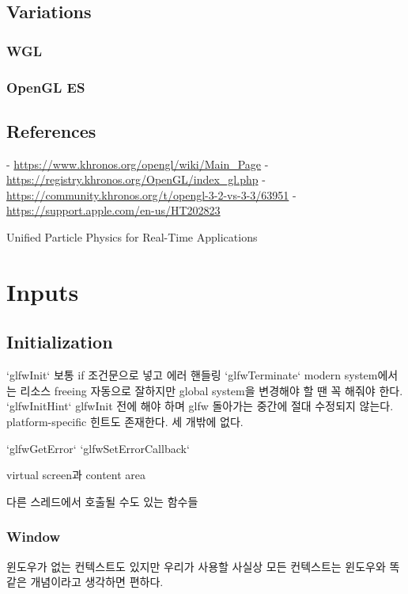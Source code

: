 \documentclass[a4paper]{report}
\begin{document}
\section{Variations}

\subsection{WGL}
\subsection{OpenGL ES}










\section{References}

- \url{https://www.khronos.org/opengl/wiki/Main_Page}
- \url{https://registry.khronos.org/OpenGL/index_gl.php}
- \url{https://community.khronos.org/t/opengl-3-2-vs-3-3/63951}
- \url{https://support.apple.com/en-us/HT202823}


Unified Particle Physics for Real-Time Applications









\chapter{Inputs}


\section{Initialization}

`glfwInit`
	보통 if 조건문으로 넣고 에러 핸들링
`glfwTerminate`
	modern system에서는 리소스 freeing 자동으로 잘하지만 global system을 변경해야 할 땐 꼭 해줘야 한다.
`glfwInitHint`
	glfwInit 전에 해야 하며 glfw 돌아가는 중간에 절대 수정되지 않는다. platform-specific 힌트도 존재한다. 세 개밖에 없다.

`glfwGetError`
`glfwSetErrorCallback`

virtual screen과 content area

다른 스레드에서 호출될 수도 있는 함수들


\subsection{Window}
윈도우가 없는 컨텍스트도 있지만 우리가 사용할 사실상 모든 컨텍스트는 윈도우와 똑같은 개념이라고 생각하면 편하다.
\end{document}
